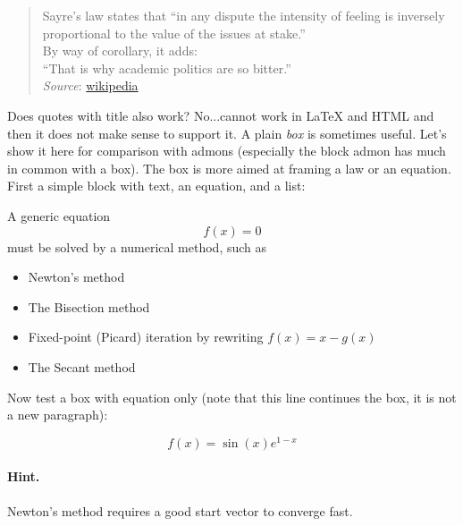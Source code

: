 \documentclass[%
oneside,                 %
final,                   %
10pt]{article}
\begin{document}
\begin{quote}
Sayre's law states that
``in any dispute the intensity of feeling is inversely
proportional to the value of the issues at stake.'' \\
By way of corollary, it adds: \\
``That is why academic politics are so bitter.'' \\
\emph{Source}: \href{{https://en.wikipedia.org/wiki/Sayre's_law}}{wikipedia}
\end{quote}

Does quotes with title also work? No...cannot work in {\LaTeX} and HTML
and then it does not make sense to support it.
A plain \emph{box} is sometimes useful. Let's show it here for comparison
with admons (especially the block admon has much in common with a box).
The box is more aimed at framing a law or an equation.
First a simple block with text, an equation, and a list:

\begin{center}
\begin{Sbox}
\begin{minipage}{0.85\linewidth}
A generic equation
\[ f(x) = 0 \]
must be solved by a numerical method, such as
\begin{itemize}
 \item Newton's method
 \item The Bisection method
 \item Fixed-point (Picard) iteration by rewriting $f(x)=x - g(x)$
 \item The Secant method
\end{itemize}
\noindent
\end{minipage}
\end{Sbox}
\fbox{\TheSbox}
\end{center}
Now test a box with equation only (note that this line continues the
box, it is not a new paragraph):

\begin{center}
\begin{Sbox}
\begin{minipage}{0.85\linewidth}
\begin{equation} f(x) = \sin(x)e^{1-x} \end{equation}
\end{minipage}
\end{Sbox}
\fbox{\TheSbox}
\end{center}
\paragraph{Hint.}
Newton's method requires a good start vector to converge fast.
\end{document}

